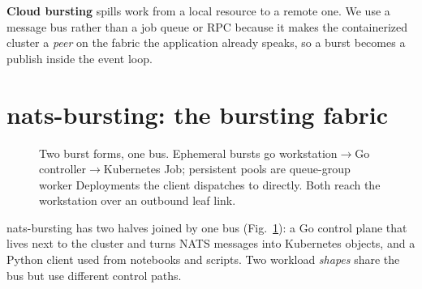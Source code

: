 \documentclass[conference]{IEEEtran}
\begin{document}
\textbf{Cloud bursting} spills work from a local resource to a remote one. We use a message bus
rather than a job queue or RPC because it makes the containerized cluster a \emph{peer} on the
fabric the application already speaks, so a burst becomes a publish inside the event loop.

\section{nats-bursting: the bursting fabric}\label{sec:bursting}

\begin{figure}[t]\centering
{}
\caption{Two burst forms, one bus. Ephemeral bursts go workstation$\to$Go controller$\to$Kubernetes
Job; persistent pools are queue-group worker Deployments the client dispatches to directly. Both
reach the workstation over an outbound leaf link.}\label{fig:arch}
\end{figure}

nats-bursting has two halves joined by one bus (Fig.~\ref{fig:arch}): a Go control plane that
lives next to the cluster and turns NATS messages into Kubernetes objects, and a Python client
used from notebooks and scripts. Two workload \emph{shapes} share the bus but use different
control paths.
\end{document}
